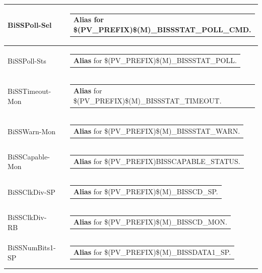 \documentclass[openany]{article}
\begin{document}
\begin{longtable}{| m{4.5cm} m{2.5cm}  m{8.0cm} |}
        BiSSPoll-Sel &  & \begin{tabular}{@{}m{6cm}@{}}
                \textbf{Alias} for \$(PV\_PREFIX)\$(M)\_BISSSTAT\_POLL\_CMD.
            \end{tabular} \hypertarget{}{}\\ \hline
        BiSSPoll-Sts &  & \begin{tabular}{@{}m{6cm}@{}}
                \textbf{Alias} for \$(PV\_PREFIX)\$(M)\_BISSSTAT\_POLL.
            \end{tabular} \hypertarget{}{}\\ \hline
        BiSSTimeout-Mon &  & \begin{tabular}{@{}m{6cm}@{}}
                \textbf{Alias} for \$(PV\_PREFIX)\$(M)\_BISSSTAT\_TIMEOUT.
            \end{tabular} \hypertarget{}{}\\ \hline
        BiSSWarn-Mon &  & \begin{tabular}{@{}m{6cm}@{}}
                \textbf{Alias} for \$(PV\_PREFIX)\$(M)\_BISSSTAT\_WARN.
            \end{tabular} \hypertarget{}{}\\ \hline
        BiSSCapable-Mon &  & \begin{tabular}{@{}m{6cm}@{}}
                \textbf{Alias} for \$(PV\_PREFIX)BISSCAPABLE\_STATUS.
            \end{tabular} \hypertarget{}{}\\ \hline
        BiSSClkDiv-SP &  & \begin{tabular}{@{}m{6cm}@{}}
                \textbf{Alias} for \$(PV\_PREFIX)\$(M)\_BISSCD\_SP.
            \end{tabular} \hypertarget{}{}\\ \hline
        BiSSClkDiv-RB &  & \begin{tabular}{@{}m{6cm}@{}}
                \textbf{Alias} for \$(PV\_PREFIX)\$(M)\_BISSCD\_MON.
            \end{tabular} \hypertarget{}{}\\ \hline
        BiSSNumBits1-SP &  & \begin{tabular}{@{}m{6cm}@{}}
                \textbf{Alias} for \$(PV\_PREFIX)\$(M)\_BISSDATA1\_SP.
            \end{tabular} \hypertarget{}{}\\ \hline

\end{longtable}
\end{document}

